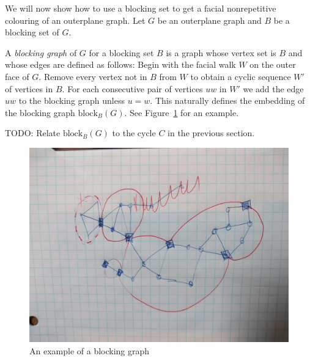 \documentclass{patmorin}
\newcommand{\block}{\mathrm{block}}
\begin{document}
We will now show how to use a blocking set to get a facial nonrepetitive
colouring of an outerplane graph. Let $G$ be an outerplane graph and $B$
be a blocking set of $G$. 

A \emph{blocking graph} of $G$ for a blocking set $B$ is a graph whose
vertex set is $B$ and whose edges are defined as follows:  Begin with the
facial walk $W$ on the outer face of $G$. Remove every vertex not in $B$
from $W$ to obtain a cyclic sequence $W'$ of vertices in $B$. For each
consecutive pair of vertices $uw$ in $W'$ we add the edge $uw$ to the
blocking graph unless $u=w$.  This naturally defines the embedding of the
blocking graph $\block_B(G)$. See Figure~\ref{fig:blocking-graph} for an example.

TODO: Relate $\block_B(G)$ to the cycle $C$ in the previous section.

\begin{figure}
  \includegraphics[width=.9\textwidth]{images/blocking}
  \caption{An example of a blocking graph}
  \label{fig:blocking-graph}
\end{figure}

\end{document}
